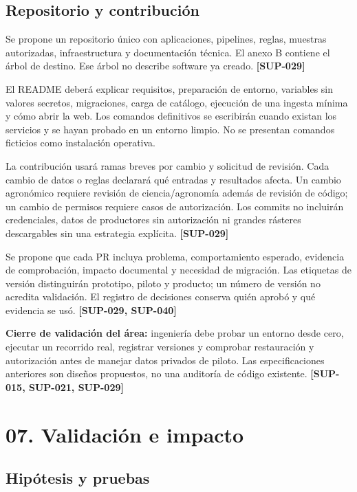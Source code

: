 \documentclass[10pt,a4paper]{article}
\begin{document}
\subsection{Repositorio y contribución}

Se propone un repositorio único con aplicaciones, pipelines, reglas, muestras autorizadas, infraestructura y documentación técnica. El anexo B contiene el árbol de destino. Ese árbol no describe software ya creado. \textbf{[SUP-029]}


El README deberá explicar requisitos, preparación de entorno, variables sin valores secretos, migraciones, carga de catálogo, ejecución de una ingesta mínima y cómo abrir la web. Los comandos definitivos se escribirán cuando existan los servicios y se hayan probado en un entorno limpio. No se presentan comandos ficticios como instalación operativa.


La contribución usará ramas breves por cambio y solicitud de revisión. Cada cambio de datos o reglas declarará qué entradas y resultados afecta. Un cambio agronómico requiere revisión de ciencia/\allowbreak{}agronomía además de revisión de código; un cambio de permisos requiere casos de autorización. Los commits no incluirán credenciales, datos de productores sin autorización ni grandes rásteres descargables sin una estrategia explícita. \textbf{[SUP-029]}


Se propone que cada PR incluya problema, comportamiento esperado, evidencia de comprobación, impacto documental y necesidad de migración. Las etiquetas de versión distinguirán prototipo, piloto y producto; un número de versión no acredita validación. El registro de decisiones conserva quién aprobó y qué evidencia se usó. \textbf{[SUP-029, SUP-040]}


\textbf{Cierre de validación del área:} ingeniería debe probar un entorno desde cero, ejecutar un recorrido real, registrar versiones y comprobar restauración y autorización antes de manejar datos privados de piloto. Las especificaciones anteriores son diseños propuestos, no una auditoría de código existente. \textbf{[SUP-015, SUP-021, SUP-029]}


\clearpage\section{07. Validación e impacto}\label{07-validación-e-impacto}

\subsection{Hipótesis y pruebas}
\end{document}
